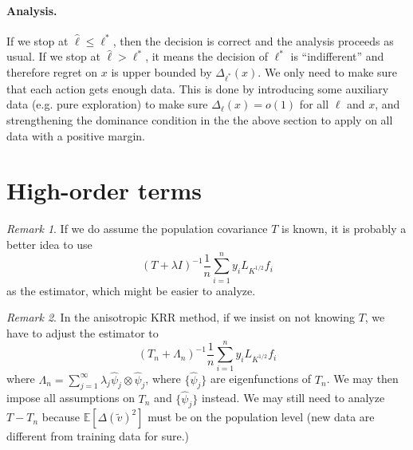 \documentclass[11pt,a4paper]{article}
\renewcommand{\hat}{\widehat}
\renewcommand{\tilde}{\widetilde}
\theoremstyle{definition}
\theoremstyle{plain}
\theoremstyle{remark}
\newtheorem{remark}{Remark}[section]
\begin{document}
 \paragraph{Analysis.} If we stop at $\hat\ell\leq\ell^*$, then the decision is correct and the analysis proceeds as usual. If we stop at $\hat\ell>\ell^*$, it means the decision of $\ell^*$ is ``indifferent''
 and therefore regret on $x$ is upper bounded by $\Delta_{\ell^*}(x)$. We only need to make sure that each action gets enough data. This is done by introducing some auxiliary data (e.g. pure exploration) to make sure $\Delta_\ell(x)=o(1)$ for all $\ell$ and $x$, and strengthening the dominance condition in the the above section to apply on all data with a positive margin.
 
 \section{High-order terms}
 
 \begin{remark}
 If we do assume the population covariance $T$ is known, it is probably a better idea to use
 $$
 (T+\lambda I)^{-1}\frac{1}{n}\sum_{i=1}^n y_i L_{K^{1/2}}f_i
 $$
 as the estimator, which might be easier to analyze.
 \end{remark}
 
 \begin{remark}
 In the anisotropic KRR method, if we insist on not knowing $T$, we have to adjust the estimator to
 $$
 (T_n+\Lambda_n)^{-1}\frac{1}{n}\sum_{i=1}^n y_i L_{K^{1/2}}f_i
 $$
 where $\Lambda_n = \sum_{j=1}^{\infty}\lambda_j \hat\psi_j\otimes\hat\psi_j$, where $\{\hat\psi_j\}$ are eigenfunctions of $T_n$.
 We may then impose all assumptions on $T_n$ and $\{\hat\psi_j\}$ instead.
 We may still need to analyze $T-T_n$ because $\mathbb E[\Delta(\tilde v)^2]$ must be on the population level (new data are different from training data for sure.)
 \end{remark}




\end{document}
